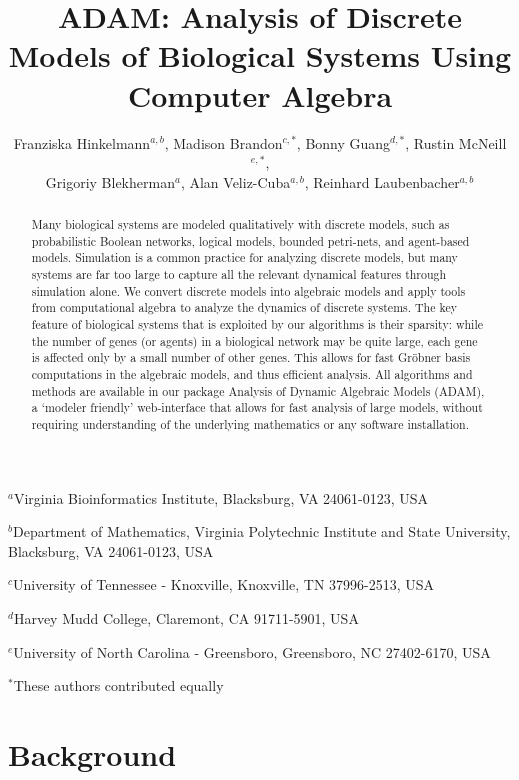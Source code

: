 \documentclass[11pt]{amsart}
\title{ADAM: Analysis of Discrete Models of Biological 
Systems Using Computer Algebra}
\author{Franziska Hinkelmann$^{a,b}$, 
Madison Brandon$^{c,*}$,
Bonny Guang$^{d,*}$,
Rustin McNeill$^{e,*}$, \\
Grigoriy Blekherman$^{a}$, 
Alan Veliz-Cuba$^{a,b}$, 
Reinhard Laubenbacher$^{a,b}$}
\begin{document}
\maketitle
{\footnotesize
     \centerline{$^a$Virginia Bioinformatics Institute, Blacksburg, VA 24061-0123, USA} 
}

{\footnotesize
     \centerline{$^b$Department of Mathematics,
      Virginia Polytechnic Institute and State University, Blacksburg, VA 24061-0123, USA} 
}

{\footnotesize
     \centerline{$^c$University of Tennessee - Knoxville, Knoxville, TN 37996-2513, USA} 
}

{\footnotesize
     \centerline{$^d$Harvey Mudd College, Claremont, CA 91711-5901, USA} 
}


{\footnotesize
     \centerline{$^e$University of North Carolina - Greensboro, Greensboro, NC 27402-6170, USA} 
}

{\footnotesize
     \centerline{$^*$These authors contributed equally} 
}

\begin{abstract}
Many biological systems are modeled qualitatively with discrete models, such as 
probabilistic Boolean networks, logical models, bounded petri-nets, and agent-based models.
Simulation is a common practice for analyzing discrete models, but many systems are far too large
to capture all the relevant dynamical features through simulation alone. We convert discrete models into algebraic models
and apply tools from computational algebra to analyze the dynamics of discrete systems. 
The key feature of biological systems that is exploited by our algorithms is their sparsity: while the number of genes (or agents) in a
biological network may be quite large, each gene is affected only by a small number of other genes. This allows for fast Gr\"{o}bner basis 
computations in the algebraic models, and thus efficient analysis.
All algorithms and methods are available in our package Analysis of Dynamic
Algebraic Models (ADAM), a `modeler friendly' web-interface
that allows for fast analysis of large models, without requiring understanding of the underlying mathematics or any software installation.
\end{abstract}


\section{Background} %
\end{document}
